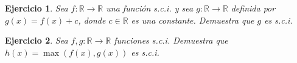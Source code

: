 \documentclass[11pt]{report}
\newtheorem{ex}{Ejercicio}
\begin{document}


\begin{ex}
  Sea \( f: \mathbb{R} \to \mathbb{R} \) una función s.c.i. y sea \( g: \mathbb{R} \to \mathbb{R} \) definida por \( g(x) = f(x) + c \), donde \( c \in \mathbb{R} \) es una constante. Demuestra que \( g \) es s.c.i.

\end{ex}

\begin{ex}
  Sea \( f, g: \mathbb{R} \to \mathbb{R} \) funciones s.c.i. Demuestra que \( h(x) = \max(f(x), g(x)) \) es s.c.i.

\end{ex}
\end{document}
